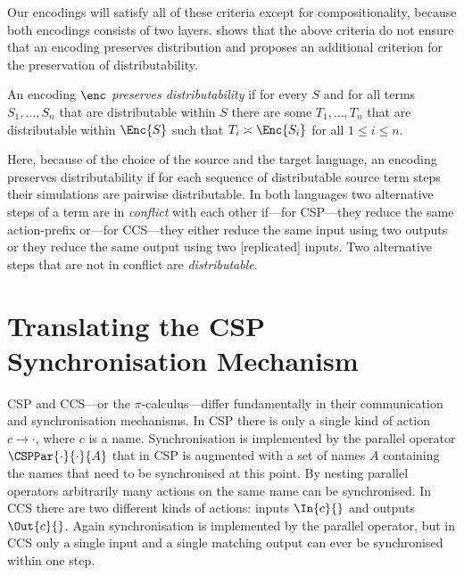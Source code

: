 \documentclass[copyright,creativecommons]{eptcs}
\begin{document}
Our encodings will satisfy all of these criteria except for compositionality, because both encodings consists of two layers.
\cite{petersNestmannGoltz13} shows that the above criteria do not ensure that an encoding preserves distribution and proposes an additional criterion for the preservation of distributability.

\begin{definition}
	\label{def:distributabilityPreservation}
	
	An encoding $ \enc $ \emph{preserves distributability} if for every $ S $ and for all terms $ S_1, \ldots, S_n $ that are distributable within $ S $ there are some $ T_1, \ldots, T_n $ that are distributable within $ \Enc{S} $ such that $ T_i \asymp \Enc{S_i} $ for all $ 1 \leq i \leq n $.
\end{definition}

\noindent
Here, because of the choice of the source and the target language, an encoding preserves distributability if for each sequence of distributable source term steps their simulations are pairwise distributable. 
In both languages two alternative steps of a term are in \emph{conflict} with each other if---for CSP---they reduce the same action-prefix or---for CCS---they either reduce the same input using two outputs or they reduce the same output using two [replicated] inputs. 
Two alternative steps that are not in conflict are \emph{distributable}.

\section{Translating the CSP Synchronisation Mechanism}
\label{sec:innerPart}

CSP and CCS---or the $ \pi $-calculus---differ fundamentally in their communication and synchronisation mechanisms.
In CSP there is only a single kind of action $ c \rightarrow \cdot $, where $ c $ is a name. 
Synchronisation is implemented by the parallel operator $ \CSPPar{\cdot}{\cdot}{A} $ that in CSP is augmented with a set of names $ A $ containing the names that need to be synchronised at this point. 
By nesting parallel operators arbitrarily many actions on the same name can be synchronised.
In CCS there are two different kinds of actions: inputs $ \In{c}{} $ and outputs $ \Out{c}{} $. Again synchronisation is implemented by the parallel operator, but in CCS only a single input and a single matching output can ever be synchronised within one step.
\end{document}
